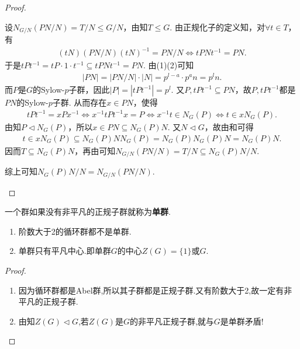 \documentclass[../../main.tex]{subfiles}%
\begin{document}
\begin{proof}
\begin{enumerate}[(1)]
设$N_{G/N}(PN/N)=T/N\leqslant G/N$，由知$T\leqslant G$. 由正规化子的定义知，对$\forall t\in T$，有
\begin{align*}
(tN)(PN/N)(tN)^{-1}=PN/N\Longleftrightarrow tPNt^{-1}=PN.
\end{align*}
于是$tPt^{-1}=tP\cdot 1\cdot t^{-1}\subseteq tPNt^{-1}=PN$. 由(1)(2)可知
\begin{align*}
|PN|=|PN/N|\cdot |N|=p^{l-a}\cdot p^an=p^ln.
\end{align*}
而$P$是$G$的Sylow-$p$子群，因此$|P|=|tPt^{-1}|=p^l$. 又$P,tPt^{-1}\subseteq PN$，故$P,tPt^{-1}$都是$PN$的Sylow-$p$子群. 从而存在$x\in PN$，使得
\begin{align*}
tPt^{-1}=xPx^{-1}\Longleftrightarrow x^{-1}tPt^{-1}x=P\Longleftrightarrow x^{-1}t\in N_G(P)\Longleftrightarrow t\in xN_G(P).
\end{align*}
由知$P\lhd N_G(P)$，所以$x\in PN\subseteq N_G(P)N$. 又$N\lhd G$，故由和可得
\begin{align*}
t\in xN_G(P)\subseteq N_G(P)NN_G(P)=N_G(P)N_G(P)N=N_G(P)N.
\end{align*}
因而$T\subseteq N_G(P)N$，再由可知$N_{G/N}(PN/N)=T/N\subseteq N_G(P)N/N$.

综上可知$N_G(P)N/N=N_{G/N}(PN/N)$.
\end{enumerate}

\end{proof}

\begin{definition}[单群]\label{definecolor:单群定义--抽象代数}
一个群如果没有非平凡的正规子群就称为\textbf{单群}.
\end{definition}

\begin{proposition}\label{proposition:阶数大于2的循环群必非单群}
\begin{enumerate}[(1)]
\item\label{proposition:阶数大于2的循环群必非单群-1} 阶数大于2的循环群都不是单群.

\item\label{proposition:阶数大于2的循环群必非单群-2} 单群只有平凡中心.即单群$G$的中心$Z(G)=\{1\}$或$G$.
\end{enumerate}
\end{proposition}
\begin{proof}
\begin{enumerate}[(1)]
\item 因为循环群都是Abel群,所以其子群都是正规子群.又有阶数大于2,故一定有非平凡的正规子群.

\item 由知$Z(G)\lhd G$,若$Z(G)$是$G$的非平凡正规子群,就与$G$是单群矛盾!
\end{enumerate}

\end{proof}
\end{document}
